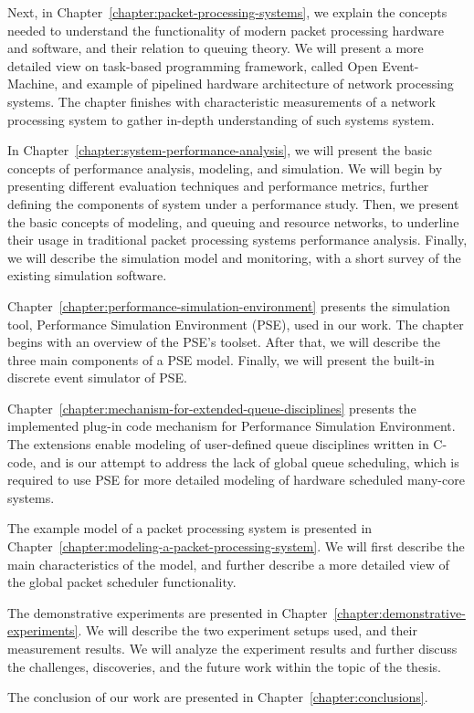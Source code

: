 Next, in Chapter~\ref{chapter:packet-processing-systems}, we explain the concepts needed to understand the functionality of modern packet processing hardware and software, and their relation to queuing theory. We will present a more detailed view on task-based programming framework, called Open Event-Machine, and example of pipelined hardware architecture of network processing systems. The chapter finishes with characteristic measurements of a network processing system to gather in-depth understanding of such systems system.

In Chapter~\ref{chapter:system-performance-analysis}, we will present the basic concepts of performance analysis, modeling, and simulation. We will begin by presenting different evaluation techniques and performance metrics, further defining the components of system under a performance study. Then, we present the basic concepts of modeling, and queuing and resource networks, to underline their usage in traditional packet processing systems performance analysis. Finally, we will describe the simulation model and monitoring, with a short survey of the existing simulation software.

Chapter~\ref{chapter:performance-simulation-environment} presents the simulation tool, Performance Simulation Environment (PSE), used in our work. The chapter begins with an overview of the PSE's toolset. After that, we will describe the three main components of a PSE model. Finally, we will present the built-in discrete event simulator of PSE.

Chapter~\ref{chapter:mechanism-for-extended-queue-disciplines} presents the implemented plug-in code mechanism for Performance Simulation Environment. The extensions enable modeling of user-defined queue disciplines written in C-code, and is our attempt to address the lack of global queue scheduling, which is required to use PSE for more detailed modeling of hardware scheduled many-core systems.

The example model of a packet processing system is presented in Chapter~\ref{chapter:modeling-a-packet-processing-system}. We will first describe the main characteristics of the model, and further describe a more detailed view of the global packet scheduler functionality.

The demonstrative experiments are presented in Chapter~\ref{chapter:demonstrative-experiments}. We will describe the two experiment setups used, and their measurement results. We will analyze the experiment results and further discuss the challenges, discoveries, and the future work within the topic of the thesis.

The conclusion of our work are presented in Chapter~\ref{chapter:conclusions}.


